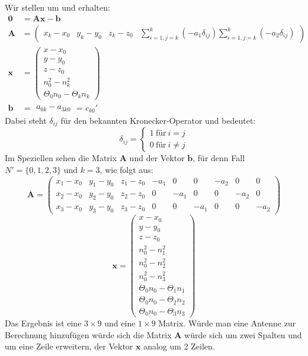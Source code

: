 {\begin{itemize}[itemsep=0mm]
\end{itemize}
%
Wir stellen um und erhalten:
\begin{align}
%
\mathbf{0}&=\mathbf{A}\mathbf{x}-\mathbf{b}\nonumber\\
\mathbf{A}&=
\left(
	\begin{array}{ccccc}
		x_k-x_0 & y_k-y_0 & z_k-z_0 & \sum_{i=1,j=k}^{k}(-a_1\delta_{ij}) \sum_{i=1,j=k}^{k}(-a_2\delta_{ij})
	\end{array}
\right)\nonumber\\
%
\mathbf{x}&=
\left(
   \begin{array}{c}
	   x-x_0\\
	   y-y_0\\
	   z-z_0\\
	   n_0^2-n_k^2\\
	   \Theta_0n_0-\Theta_kn_k
   \end{array}
\right)\nonumber\\
%
\mathbf{b}&=
	\begin{array}{c}
		a_{0k}-a_{3k0} 
	\end{array}
	= c_{k0}'\nonumber
\end{align}
%
Dabei steht $\delta_{ij}$ für den bekannten Kronecker-Operator und bedeutet:
$$ 
\delta_{ij} = \begin{cases}1 ~\text{für}~ i=j\\ 0 ~\text{für}~ i\neq j\end{cases}
$$
Im Speziellen sehen die Matrix $\mathbf{A}$ und der Vektor $\mathbf{b}$, für denn Fall $N'=\{0,1,2,3\}$ und $k=3$, wie folgt aus:
%
\begin{equation}
\mathbf{A}=
\left(
	\begin{array}{ccccccccc}
		x_1-x_0 & y_1-y_0 & z_1-z_0 & -a_1 & 0 & 0 & -a_2 & 0 & 0 \\
		x_2-x_0 & y_2-y_0 & z_2-z_0 & 0 & -a_1 & 0 & 0 & -a_2 & 0 \\
		x_3-x_0 & y_3-y_0 & z_3-z_0 & 0 & 0 & -a_1 & 0 & 0 & -a_2
	\end{array}
\right)
\end{equation}
\begin{equation}
\mathbf{x}=
\left(
	\begin{array}{c}
		x-x_0\\
		y-y_0\\
		z-z_0\\
		n_0^2-n_1^2\\
		n_0^2-n_2^2\\
		n_0^2-n_3^2\\
		\Theta_0n_0-\Theta_1n_1\\
		\Theta_0n_0-\Theta_2n_2\\
		\Theta_0n_0-\Theta_3n_3
		
	\end{array}
\right)
\end{equation}
Das Ergebnis ist eine $3\times9$ und eine $1\times9$ Matrix. Würde man eine Antenne zur Berechnung hinzufügen würde sich die Matrix $\mathbf{A}$ würde sich um zwei Spalten und um eine Zeile erweitern, der Vektor $\mathbf{x}$ analog um 2 Zeilen.

}